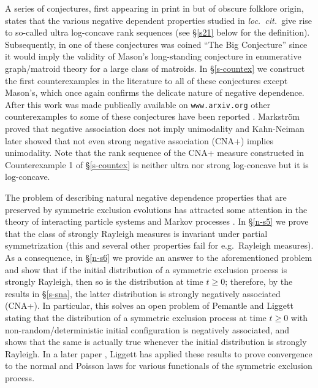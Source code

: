\documentclass[10pt,reqno]{amsart}
\theoremstyle{plain}
\theoremstyle{definition}
\theoremstyle{remark}
\begin{document}
A series of conjectures, first appearing in print in \cite[Conjecture
4]{P} but of obscure folklore origin, states that the various negative
dependent properties studied in {\em loc.~cit.~}give rise to so-called
ultra log-concave rank sequences (see \S \ref{s21} below for the definition). 
Subsequently, in \cite{W} one of these conjectures was coined ``The Big
Conjecture'' since it would imply the validity of Mason's long-standing
conjecture in enumerative graph/matroid theory \cite{Mason} for a large 
class of matroids.
In \S \ref{s-countex} we construct the first counterexamples in the literature 
to all of these conjectures except Mason's, which once again confirms the 
delicate nature of negative dependence. After this work was made publically 
available on \texttt{www.arxiv.org} other counterexamples to some 
of these conjectures have been reported \cite{KN,Mark}. 
Markstr\"om \cite{Mark} proved that negative association does not imply 
unimodality and Kahn-Neiman \cite{KN} later showed that not even strong 
negative association (CNA+) implies unimodality.  
Note that the rank sequence of the CNA+ measure constructed in 
Counterexample 1 of \S \ref{s-countex} is neither ultra nor strong 
log-concave but it is log-concave.

The problem of describing natural
negative dependence properties that are preserved by symmetric exclusion 
evolutions has 
attracted some attention in the theory of 
interacting particle systems
and Markov processes \cite{L0,L00,L2}. In \S \ref{n-s5} we prove that the 
class of strongly Rayleigh measures is invariant
under partial symmetrization (this and several other properties fail
for e.g.~Rayleigh measures). As a consequence, in \S \ref{n-s6} we provide 
an answer to the aforementioned problem and show that if the
initial distribution of a symmetric exclusion process is strongly Rayleigh, 
then so is the distribution at time $t \geq 0$; therefore,  
by the results in \S \ref{s-sna}, the latter distribution is 
strongly negatively associated (CNA+). In particular, this 
solves an open problem of Pemantle \cite{P} and Liggett \cite{L2} stating 
that the
distribution of a symmetric exclusion process at time $t\geq 0$ with 
non-random/deterministic initial configuration is negatively associated, and 
shows that 
the same is actually true whenever the initial distribution is strongly 
Rayleigh. In a later paper \cite{L3}, Liggett has applied these results to 
prove convergence to the normal and Poisson laws for various functionals
of the symmetric exclusion process. 
\end{document}

